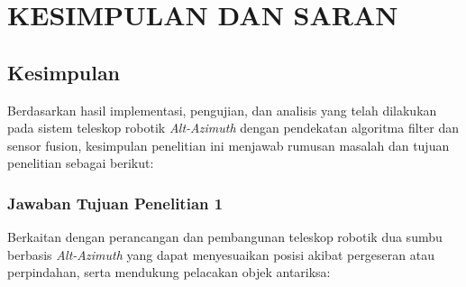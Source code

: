 \cleardoublepage
\chapter{KESIMPULAN DAN SARAN} \label{Bab V}

\section{Kesimpulan} \label{V.Kesimpulan}
Berdasarkan hasil implementasi, pengujian, dan analisis yang telah dilakukan pada sistem teleskop robotik \textit{Alt-Azimuth} dengan pendekatan algoritma filter dan sensor fusion, kesimpulan penelitian ini menjawab rumusan masalah dan tujuan penelitian sebagai berikut: \par

\subsection{Jawaban Tujuan Penelitian 1}
Berkaitan dengan perancangan dan pembangunan teleskop robotik dua sumbu berbasis \textit{Alt-Azimuth} yang dapat menyesuaikan posisi akibat pergeseran atau perpindahan, serta mendukung pelacakan objek antariksa: \par


